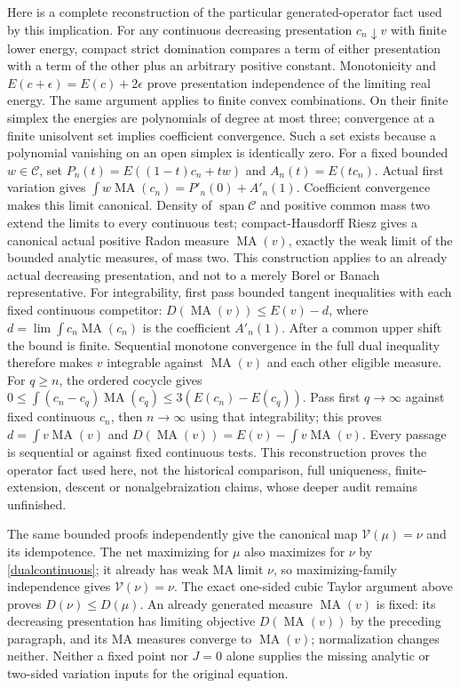 \documentclass[11pt]{article}
\newcommand{\MA}{\operatorname{MA}}
\newcommand{\C}{\mathcal C}
\begin{document}
Here is a complete reconstruction of the particular generated-operator
fact used by this implication. For any continuous decreasing
presentation $c_n\downarrow v$ with finite lower energy, compact strict
domination compares a term of either presentation with a term of the
other plus an arbitrary positive constant. Monotonicity and
$E(c+\epsilon)=E(c)+2\epsilon$ prove presentation independence of
the limiting real energy. The same argument applies to finite convex
combinations. On their finite simplex the energies are polynomials of
degree at most three; convergence at a finite unisolvent set implies
coefficient convergence. Such a set exists because a polynomial
vanishing on an open simplex is identically zero.
For a fixed bounded $w\in\C$, set
$P_n(t)=E((1-t)c_n+tw)$ and $A_n(t)=E(tc_n)$.
Actual first variation gives
$\int w\MA(c_n)=P'_n(0)+A'_n(1)$.
Coefficient convergence makes this limit canonical. Density of
$\operatorname{span}\C$ and positive common mass two extend the limits
to every continuous test; compact-Hausdorff Riesz gives a canonical
actual positive Radon measure $\MA(v)$, exactly the weak limit of the
bounded analytic measures, of mass two. This construction applies to
an already actual decreasing presentation, and not to a merely Borel
or Banach representative.
For integrability, first pass bounded tangent inequalities with each
fixed continuous competitor: $D(\MA(v))\le E(v)-d$, where
$d=\lim\int c_n\MA(c_n)$ is the coefficient $A'_n(1)$.
After a common upper shift the bound is finite. Sequential monotone
convergence in the full dual inequality therefore makes $v$ integrable
against $\MA(v)$ and each other eligible measure.
For $q\ge n$, the ordered cocycle gives
$0\le\int(c_n-c_q)\MA(c_q)\le3(E(c_n)-E(c_q))$.
Pass first $q\to\infty$ against fixed continuous $c_n$, then
$n\to\infty$ using that integrability; this proves
$d=\int v\MA(v)$ and
$D(\MA(v))=E(v)-\int v\MA(v)$.
Every passage is sequential or against fixed continuous tests.
This reconstruction proves the operator fact used here, not the
historical comparison, full uniqueness, finite-extension, descent or
nonalgebraization claims, whose deeper audit remains unfinished.

The same bounded proofs independently give the canonical map
$\mathcal V(\mu)=\nu$ and its idempotence. The net maximizing for
$\mu$ also maximizes for $\nu$ by \eqref{dualcontinuous}; it already
has weak MA limit $\nu$, so maximizing-family independence gives
$\mathcal V(\nu)=\nu$. The exact one-sided cubic Taylor argument
above proves $D(\nu)\le D(\mu)$. An already generated measure
$\MA(v)$ is fixed: its decreasing presentation has limiting
objective $D(\MA(v))$ by the preceding paragraph, and its MA measures
converge to $\MA(v)$; normalization changes neither. Neither a fixed
point nor $J=0$ alone supplies the missing analytic or two-sided
variation inputs for the original equation.
\end{document}
